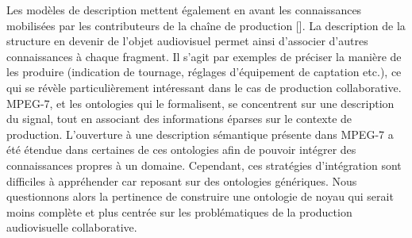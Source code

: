 Les modèles de description  mettent également en avant les connaissances mobilisées par les contributeurs de la chaîne de production [].
La description de la structure en devenir de l'objet audiovisuel permet ainsi d'associer d'autres connaissances à chaque fragment. Il s'agit par exemples de préciser la manière de les produire (indication de tournage, réglages d'équipement de captation etc.), ce qui se révèle particulièrement intéressant dans le cas de production collaborative.
MPEG-7, et les ontologies qui le formalisent, se concentrent sur une description du signal, tout en associant des informations éparses sur le contexte de production.
L'ouverture à une description sémantique présente dans MPEG-7 a été étendue dans certaines de ces ontologies afin de pouvoir intégrer des connaissances propres à un domaine.
Cependant, ces stratégies d'intégration sont difficiles à appréhender car reposant sur des ontologies génériques. 
Nous questionnons alors la pertinence de construire une ontologie de noyau qui serait moins complète et plus centrée sur les problématiques de la production audiovisuelle collaborative.







